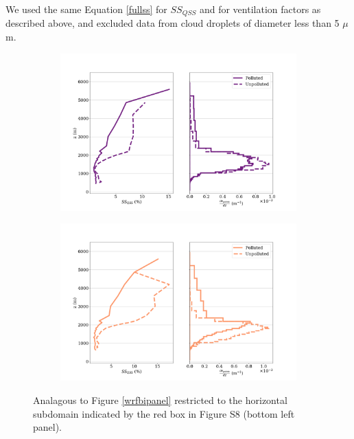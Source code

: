 \documentclass{article}
\begin{document}
We used the same Equation \ref{fullss} for $SS_{QSS}$ and for ventilation factors as described above, and excluded data from cloud droplets of diameter less than 5 $\mu$m.

\begin{figure}[ht]
	\centering
	\begin{subfigure}{0.7\textwidth}
		\includegraphics[width=\textwidth]{revmywrf/v1_FINAL_subdom_bipanel_ss_qss_vs_z_allpts_figure.png}
		\caption{}
		\label{wrfsubdombipanelallpts}
	\end{subfigure}
	\begin{subfigure}{0.7\textwidth}
		\includegraphics[width=\textwidth]{revmywrf/v1_FINAL_subdom_bipanel_ss_qss_vs_z_up10perc_figure.png}
		\caption{}
		\label{wrfsubdombipanelup50perc}
	\end{subfigure}
	\caption{Analagous to Figure \ref{wrfbipanel} restricted to the horizontal subdomain indicated by the red box in Figure S8 (bottom left panel).}
	\label{wrfsubdombipanel}
\end{figure}
\end{document}
